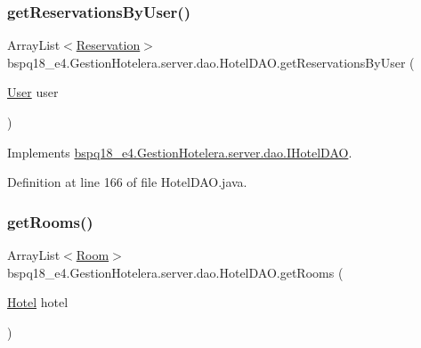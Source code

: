 \subsubsection{\texorpdfstring{get\+Reservations\+By\+User()}{getReservationsByUser()}}
{\footnotesize\ttfamily Array\+List$<$\mbox{\hyperlink{classbspq18__e4_1_1_gestion_hotelera_1_1server_1_1data_1_1_reservation}{Reservation}}$>$ bspq18\+\_\+e4.\+Gestion\+Hotelera.\+server.\+dao.\+Hotel\+D\+A\+O.\+get\+Reservations\+By\+User (\begin{DoxyParamCaption}\item[{\mbox{\hyperlink{classbspq18__e4_1_1_gestion_hotelera_1_1server_1_1data_1_1_user}{User}}}]{user }\end{DoxyParamCaption})}



Implements \mbox{\hyperlink{interfacebspq18__e4_1_1_gestion_hotelera_1_1server_1_1dao_1_1_i_hotel_d_a_o_afa1838e14526101d626d241da08c3b13}{bspq18\+\_\+e4.\+Gestion\+Hotelera.\+server.\+dao.\+I\+Hotel\+D\+AO}}.



Definition at line 166 of file Hotel\+D\+A\+O.\+java.

\mbox{\label{classbspq18__e4_1_1_gestion_hotelera_1_1server_1_1dao_1_1_hotel_d_a_o_ad835d35e68060bbe97b32d67092878d9}} 
\subsubsection{\texorpdfstring{get\+Rooms()}{getRooms()}}
{\footnotesize\ttfamily Array\+List$<$\mbox{\hyperlink{classbspq18__e4_1_1_gestion_hotelera_1_1server_1_1data_1_1_room}{Room}}$>$ bspq18\+\_\+e4.\+Gestion\+Hotelera.\+server.\+dao.\+Hotel\+D\+A\+O.\+get\+Rooms (\begin{DoxyParamCaption}\item[{\mbox{\hyperlink{classbspq18__e4_1_1_gestion_hotelera_1_1server_1_1data_1_1_hotel}{Hotel}}}]{hotel }\end{DoxyParamCaption})}



